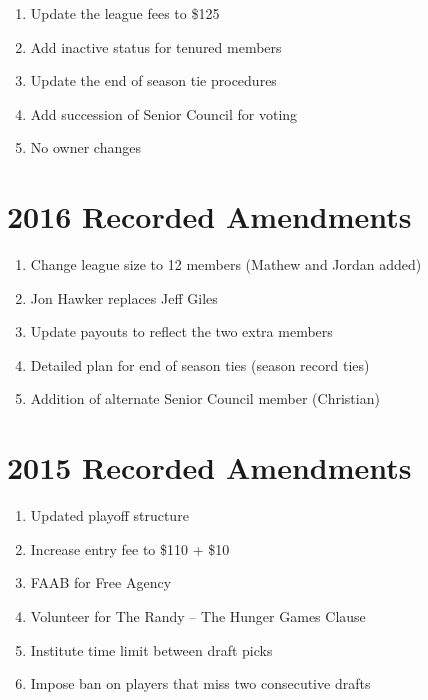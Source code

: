 \documentclass[
]{book}
\providecommand{\tightlist}{%
  \setlength{\itemsep}{0pt}\setlength{\parskip}{0pt}}
\begin{document}
\begin{enumerate}
\def\labelenumi{\arabic{enumi}.}
\tightlist
\item
  Update the league fees to \$125
\item
  Add inactive status for tenured members
\item
  Update the end of season tie procedures
\item
  Add succession of Senior Council for voting
\item
  No owner changes
\end{enumerate}

\hypertarget{recorded-amendments-4}{%
\section{2016 Recorded Amendments}\label{recorded-amendments-4}}

\begin{enumerate}
\def\labelenumi{\arabic{enumi}.}
\tightlist
\item
  Change league size to 12 members (Mathew and Jordan added)
\item
  Jon Hawker replaces Jeff Giles
\item
  Update payouts to reflect the two extra members
\item
  Detailed plan for end of season ties (season record ties)
\item
  Addition of alternate Senior Council member (Christian)
\end{enumerate}

\hypertarget{recorded-amendments-5}{%
\section{2015 Recorded Amendments}\label{recorded-amendments-5}}

\begin{enumerate}
\def\labelenumi{\arabic{enumi}.}
\tightlist
\item
  Updated playoff structure
\item
  Increase entry fee to \$110 + \$10
\item
  FAAB for Free Agency
\item
  Volunteer for The Randy -- The Hunger Games Clause
\item
  Institute time limit between draft picks
\item
  Impose ban on players that miss two consecutive drafts
\end{enumerate}
\end{document}
